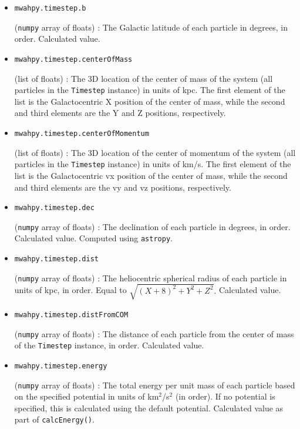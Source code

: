 \documentclass{article}
\begin{document}
\begin{itemize}

\item \verb!mwahpy.timestep.b!

(\verb!numpy! array of floats) : The Galactic latitude of each particle in degrees, in order. Calculated value.

\item \verb!mwahpy.timestep.centerOfMass!

(list of floats) : The 3D location of the center of mass of the system (all particles in the \verb!Timestep! instance) in units of kpc. The first element of the list is the Galactocentric X position of the center of mass, while the second and third elements are the Y and Z positions, respectively.

\item \verb!mwahpy.timestep.centerOfMomentum!

(list of floats) : The 3D location of the center of momentum of the system (all particles in the \verb!Timestep! instance) in units of km/s. The first element of the list is the Galactocentric vx position of the center of mass, while the second and third elements are the vy and vz positions, respectively.

\item \verb!mwahpy.timestep.dec!

(\verb!numpy! array of floats) : The declination of each particle in degrees, in order. Calculated value. Computed using \verb!astropy!.

\item \verb!mwahpy.timestep.dist!

(\verb!numpy! array of floats) : The heliocentric spherical radius of each particle in units of kpc, in order. Equal to $\sqrt{(X + 8)^2 + Y^2 + Z^2}.$ Calculated value.

\item \verb!mwahpy.timestep.distFromCOM!

(\verb!numpy! array of floats) : The distance of each particle from the center of mass of the \verb!Timestep! instance, in order. Calculated value.

\item \verb!mwahpy.timestep.energy!

(\verb!numpy! array of floats) : The total energy per unit mass of each particle based on the specified potential in units of km$^2$/s$^2$ (in order). If no potential is specified, this is calculated using the default \mwahpy potential. Calculated value as part of \verb!calcEnergy()!.


\end{itemize}
\end{document}
